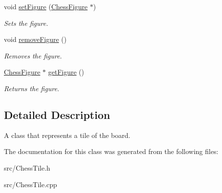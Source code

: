 \begin{DoxyCompactItemize}
\mbox{\label{classChessTile_a31724ea2e6019fb367b8b2e8812d8fa6}} 
void \mbox{\hyperlink{classChessTile_a31724ea2e6019fb367b8b2e8812d8fa6}{set\+Figure}} (\mbox{\hyperlink{classChessFigure}{Chess\+Figure}} $\ast$)
\begin{DoxyCompactList}\small\item\em Sets the figure. \end{DoxyCompactList}\item 
\mbox{\label{classChessTile_a3e6e2cb3d4582c05b48804105beeafb6}} 
void \mbox{\hyperlink{classChessTile_a3e6e2cb3d4582c05b48804105beeafb6}{remove\+Figure}} ()
\begin{DoxyCompactList}\small\item\em Removes the figure. \end{DoxyCompactList}\item 
\mbox{\label{classChessTile_a7aecc8930e76dc4ea934abe16dc68dcb}} 
\mbox{\hyperlink{classChessFigure}{Chess\+Figure}} $\ast$ \mbox{\hyperlink{classChessTile_a7aecc8930e76dc4ea934abe16dc68dcb}{get\+Figure}} ()
\begin{DoxyCompactList}\small\item\em Returns the figure. \end{DoxyCompactList}\end{DoxyCompactItemize}


\subsection{Detailed Description}
A class that represents a tile of the board. 

The documentation for this class was generated from the following files\+:\begin{DoxyCompactItemize}
\item 
src/Chess\+Tile.\+h\item 
src/Chess\+Tile.\+cpp\end{DoxyCompactItemize}
